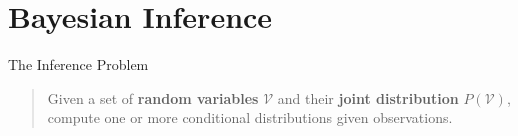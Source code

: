 \documentclass[10pt,usenames,dvipsnames]{beamer}
\begin{document}
\section{Bayesian Inference}


\begin{frame}{The Inference Problem}
  \begin{small}
    \begin{quote} 
      Given a set of \textbf{random variables} $\mathcal{V}$ and their
      \textbf{joint distribution} $P(\mathcal{V})$,\\ compute one or more conditional
      distributions given observations.
    \end{quote}
  \end{small}
\end{frame}
\end{document}
